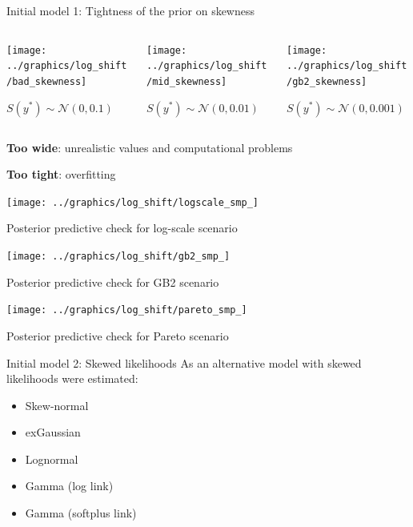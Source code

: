 \begin{frame}{Initial model 1: Tightness of the prior on skewness}

    \begin{columns}
        \begin{column}{0.32\textwidth}
            \texttt{[image: ../graphics/log\_shift/bad\_skewness]}

            $S(y^*) \sim \mathcal N (0, 0.1)$
        \end{column}



        \begin{column}{0.32\textwidth}
            \texttt{[image: ../graphics/log\_shift/mid\_skewness]}

            $S(y^*) \sim \mathcal N (0, 0.01)$
        \end{column}


        \begin{column}{0.32\textwidth}
            \texttt{[image: ../graphics/log\_shift/gb2\_skewness]}

            $S(y^*) \sim \mathcal N (0, 0.001)$
        \end{column}

    \end{columns}
    \vspace{1cm}
    \textbf{Too wide}: unrealistic values and computational problems
    \vspace{0.5cm}

    \textbf{Too tight}: overfitting
\end{frame}

\begin{frame}
    \vspace{-0.5cm}
    \centering
    \texttt{[image: ../graphics/log\_shift/logscale\_smp\_]}

    \scriptsize{Posterior predictive check for log-scale scenario}

    \texttt{[image: ../graphics/log\_shift/gb2\_smp\_]}

    \scriptsize{Posterior predictive check for GB2 scenario}

    \texttt{[image: ../graphics/log\_shift/pareto\_smp\_]}

    \scriptsize{Posterior predictive check for Pareto scenario}

\end{frame}

\begin{frame}{Initial model 2: Skewed likelihoods}
    As an alternative model with skewed likelihoods were estimated:
    \begin{itemize}
        \item Skew-normal
        \item exGaussian
        \item Lognormal
        \item Gamma (log link)
        \item Gamma (softplus link)
    \end{itemize}
\end{frame}

